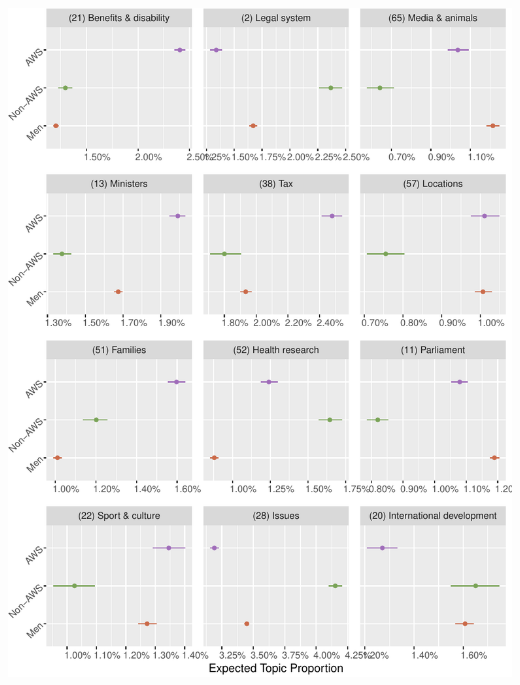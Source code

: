 \documentclass[]{article}
\let\origfigure\figure
\let\endorigfigure\endfigure
\renewenvironment{figure}[1][2] {
    \expandafter\origfigure\expandafter[H]
} {
    \endorigfigure
}
\theoremstyle{definition}
\theoremstyle{definition}
\theoremstyle{definition}
\theoremstyle{remark}
\begin{document}
\begin{table}[H]
\begin{table}[H]
\begin{table}[H]
\begin{table}[H]
\begin{table}[H]
\begin{table}[H]
\begin{table}[H]
\begin{table}[H]
\begin{figure}
\centering
\includegraphics{methodology_files/figure-latex/p-effect1-1.pdf}
\caption{\label{fig:p-effect1}Where AWS MPs are most distinct from non-AWS
female MPs}
\end{figure}


\end{table}
\end{table}
\end{table}
\end{table}
\end{table}
\end{table}
\end{table}
\end{table}
\end{document}
